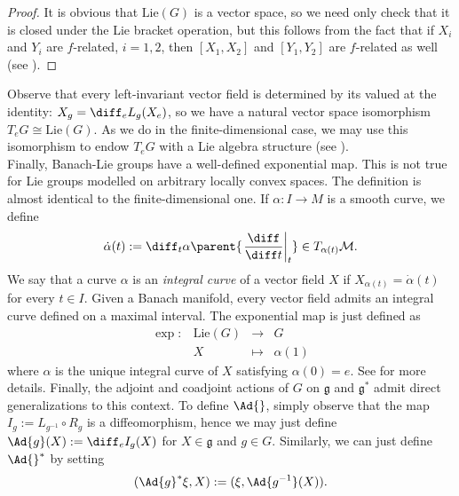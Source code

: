  \begin{proof}
    It is obvious that \(\mathrm{Lie}(G)\) is a vector space, so we need only check that it is closed under the Lie bracket operation, but this follows from the fact that if \(X_i\) and \(Y_i\) are \(f\)-related, \(i=1,2\), then \([X_1, X_2]\) and \([Y_1, Y_2]\) are \(f\)-related as well (see \parencite[Page 117]{SergeLang}).
 \end{proof}

 Observe that every left-invariant vector field is determined by its valued at the identity: \(X_{g}=\diff_e L_g(X_e)\), so we have a natural vector space isomorphism \(T_eG \cong \mathrm{Lie}(G)\). As we do in the finite-dimensional case, we may use this isomorphism to endow \(T_eG\) with a Lie algebra structure (see \parencite[Sec. 1.1.2]{Schmeding_2022}). \\

 Finally, Banach-Lie groups have a well-defined exponential map. This is not true for Lie groups modelled on arbitrary locally convex spaces. The definition is almost identical to the finite-dimensional one. If \(\alpha\colon I \to M\) is a smooth curve, we define 
 \begin{equation} \label{def_derivative_curve_Banach_manifold}
 \dot{\alpha}(t):=\diff_t\alpha\parent{\left. \frac{\diff}{\diff t} \right|_{t}} \in T_{\alpha(t)}\mathcal{M}.
 \end{equation}
 We say that a curve \(\alpha\) is an \textit{integral curve} of a vector field \(X\) if \(X_{\alpha(t)}=\dot{\alpha}(t)\) for every \(t \in I\). Given a Banach manifold, every vector field admits an integral curve defined on a maximal interval. The exponential map is just defined as
 \[
 \begin{array}{cccc}
    \exp \colon & \mathrm{Lie}(G) & \longrightarrow & G \\
    & X & \mapsto & \alpha(1)
 \end{array}
 \]
 where \(\alpha\) is the unique integral curve of \(X\) satisfying \(\alpha(0)=e\). See \parencite{Dodson_Galanis_Vassiliou_2015} for more details. Finally, the adjoint and coadjoint actions of \(G\) on \(\mathfrak{g}\) and \(\mathfrak{g}^*\) admit direct generalizations to this context. To define \(\Ad{}\), simply observe that the map \(I_g:=L_{g^{-1}} \circ R_g\) is a diffeomorphism, hence we may just define \(\Ad{g}(X):=\diff_e I_g(X)\) for \(X \in \mathfrak{g}\) and \(g \in G\). Similarly, we can just define \(\Ad{}^*\) by setting 
\[
(\Ad{g}^* \xi, X) :=(\xi, \Ad{g^{-1}}(X)).
\]


